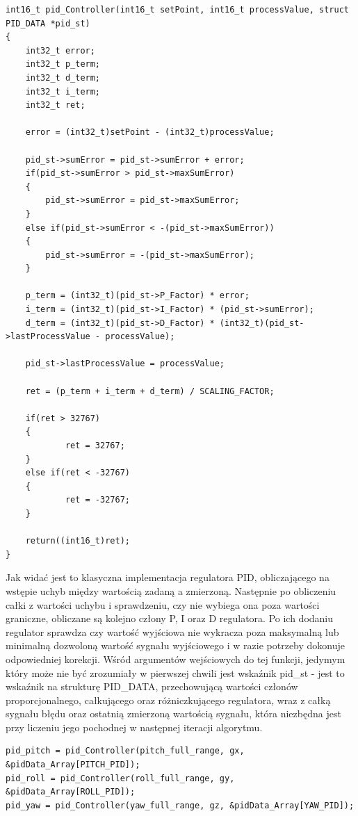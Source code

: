 \begin{lstlisting}
int16_t pid_Controller(int16_t setPoint, int16_t processValue, struct PID_DATA *pid_st)
{
	int32_t error;
	int32_t p_term;
	int32_t d_term;
	int32_t i_term; 
	int32_t ret;

  	error = (int32_t)setPoint - (int32_t)processValue;

	pid_st->sumError = pid_st->sumError + error;
	if(pid_st->sumError > pid_st->maxSumError)
	{
		pid_st->sumError = pid_st->maxSumError;
	}
	else if(pid_st->sumError < -(pid_st->maxSumError))
	{
		pid_st->sumError = -(pid_st->maxSumError);
	}
	
	p_term = (int32_t)(pid_st->P_Factor) * error;
  	i_term = (int32_t)(pid_st->I_Factor) * (pid_st->sumError);
  	d_term = (int32_t)(pid_st->D_Factor) * (int32_t)(pid_st->lastProcessValue - processValue);

  	pid_st->lastProcessValue = processValue;

  	ret = (p_term + i_term + d_term) / SCALING_FACTOR;
  
 	if(ret > 32767)
	{
    		ret = 32767;
  	}
  	else if(ret < -32767)
	{
    		ret = -32767;
  	}

  	return((int16_t)ret);
}
\end{lstlisting}

Jak widać jest to klasyczna implementacja regulatora PID, obliczającego na wstępie uchyb między wartością zadaną a zmierzoną. Następnie po obliczeniu całki z wartości uchybu i sprawdzeniu, czy nie wybiega ona poza wartości graniczne, obliczane są kolejno człony P, I oraz D regulatora. Po ich dodaniu regulator sprawdza czy wartość wyjściowa nie wykracza poza maksymalną lub minimalną dozwoloną wartość sygnału wyjściowego i w razie potrzeby dokonuje odpowiedniej korekcji. Wśród argumentów wejściowych do tej funkcji, jedymym który może nie być zrozumiały w pierwszej chwili jest wskaźnik pid\_st - jest to wskaźnik na strukturę PID\_DATA, przechowującą wartości członów proporcjonalnego, całkującego oraz różniczkującego regulatora, wraz z całką sygnału błędu oraz ostatnią zmierzoną wartością sygnału, która niezbędna jest przy liczeniu jego pochodnej w następnej iteracji algorytmu.

\begin{lstlisting}
pid_pitch = pid_Controller(pitch_full_range, gx, &pidData_Array[PITCH_PID]);
pid_roll = pid_Controller(roll_full_range, gy, &pidData_Array[ROLL_PID]);
pid_yaw = pid_Controller(yaw_full_range, gz, &pidData_Array[YAW_PID]);
\end{lstlisting}

